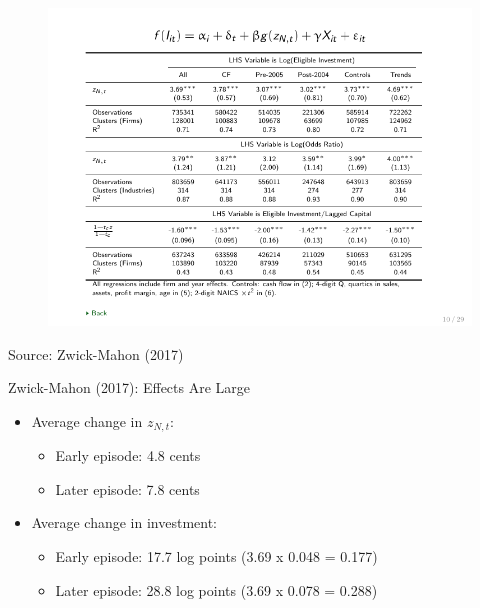 \documentclass[english,xcolor=svgnames,aspectratio=169]{beamer}
\begin{document}
\begin{frame}
\begin{figure}
	\centering
	\includegraphics[height=0.9 \textheight]{figures/ZwickMahon2017Table3.pdf}
\end{figure}
\vspace{-4mm}
{\scriptsize Source: Zwick-Mahon (2017)}
\end{frame}


\begin{frame}{Zwick-Mahon (2017): Effects Are Large}
\begin{itemize}
	\itemsep1em 
	\item Average change in $z_{N,t}$: 
	\begin{itemize}
		\item Early episode: 4.8 cents
		\item Later episode: 7.8 cents
	\end{itemize}
	\item Average change in investment:
	\begin{itemize}
		\item Early episode: 17.7 log points (3.69 x 0.048 = 0.177)
		\item Later episode: 28.8 log points (3.69 x 0.078 = 0.288)	
	\end{itemize}
\end{itemize}
\end{frame}
\end{document}
